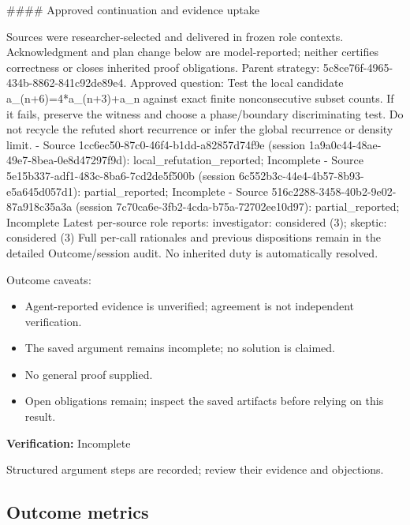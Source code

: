 \documentclass[11pt]{article}
\begin{document}
\#\#\#\# Approved continuation and evidence uptake

Sources were researcher-selected and delivered in frozen role contexts. Acknowledgment and plan change below are model-reported; neither certifies correctness or closes inherited proof obligations.
Parent strategy: 5c8ce76f-4965-434b-8862-841c92de89e4. Approved question: Test the local candidate a\_(n+6)=4*a\_(n+3)+a\_n against exact finite nonconsecutive subset counts. If it fails, preserve the witness and choose a phase/boundary discriminating test. Do not recycle the refuted short recurrence or infer the global recurrence or density limit.
- Source 1cc6ec50-87c0-46f4-b1dd-a82857d74f9e (session 1a9a0c44-48ae-49e7-8bea-0e8d47297f9d): local\_refutation\_reported; Incomplete
- Source 5e15b337-adf1-483c-8ba6-7cd2de5f500b (session 6c552b3c-44e4-4b57-8b93-e5a645d057d1): partial\_reported; Incomplete
- Source 516c2288-3458-40b2-9e02-87a918c35a3a (session 7c70ca6e-3fb2-4cda-b75a-72702ee10d97): partial\_reported; Incomplete
Latest per-source role reports: investigator: considered (3); skeptic: considered (3)
Full per-call rationales and previous dispositions remain in the detailed Outcome/session audit. No inherited duty is automatically resolved.\par
Outcome caveats:\par
\begin{itemize}
\item Agent-reported evidence is unverified; agreement is not independent verification.
\item The saved argument remains incomplete; no solution is claimed.
\item No general proof supplied.
\item Open obligations remain; inspect the saved artifacts before relying on this result.
\end{itemize}
\textbf{Verification:} Incomplete\par
Structured argument steps are recorded; review their evidence and objections.\par
\subsection{Outcome metrics}
\end{document}
